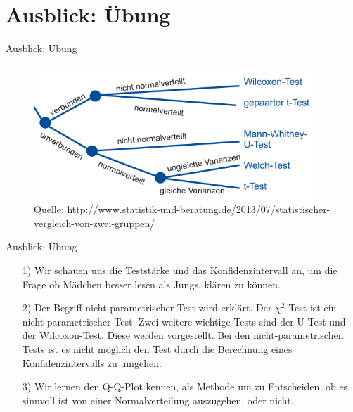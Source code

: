 \documentclass[usenames,dvipsnames,handout]{beamer}
\begin{document}
\section{Ausblick: Übung}


\begin{frame}{Ausblick: Übung}
 \begin{figure}[ht]
 	\centering
 	      \includegraphics[width=0.95\textwidth]{Test_EB.png}%
 	      \caption{Quelle: \url{http://www.statistik-und-beratung.de/2013/07/statistischer-vergleich-von-zwei-gruppen/}}
 	\end{figure}
\end{frame}


\begin{frame}{Ausblick: Übung}
\begin{itemize}
\item[1)]{Wir schauen uns die Teststärke und das Konfidenzintervall an, um die 
Frage ob Mädchen besser lesen als Jungs, klären zu können.}\pause
\item[2)]{Der Begriff nicht-parametrischer Test wird erklärt. Der $\chi^{2}$-Test
ist ein nicht-parametrischer Test. Zwei weitere wichtige Tests sind der U-Test und der
Wilcoxon-Test. Diese werden vorgestellt. Bei den nicht-parametrischen Tests ist es nicht möglich den Test durch die Berechnung
eines Konfidenzintervalls zu umgehen.}\pause
\item[3)]{Wir lernen den Q-Q-Plot kennen, als Methode um zu Entscheiden, ob es sinnvoll
ist von einer Normalverteilung auszugehen, oder nicht.}\pause
\end{itemize}
\end{frame}
\end{document}
